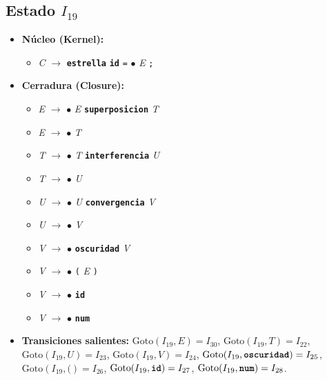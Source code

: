 \documentclass[12pt, letterpaper]{article}
\begin{document}
\subsection*{Estado $I_{19}$ }
\begin{itemize}\setlength{\itemsep}{1pt}\setlength{\parskip}{0pt}
\item \textbf{Núcleo (Kernel):}
\begin{itemize}\setlength{\itemsep}{1pt}\setlength{\parskip}{0pt}
    \item \textit{C} $\to$ \textbf{\texttt{estrella}} \textbf{\texttt{id}} \texttt{=} $\bullet$ \textit{E} \texttt{;}
\end{itemize}
\item \textbf{Cerradura (Closure):}
\begin{itemize}\setlength{\itemsep}{1pt}\setlength{\parskip}{0pt}
    \item \textit{E} $\to$ $\bullet$ \textit{E} \textbf{\texttt{superposicion}} \textit{T}
    \item \textit{E} $\to$ $\bullet$ \textit{T}
    \item \textit{T} $\to$ $\bullet$ \textit{T} \textbf{\texttt{interferencia}} \textit{U}
    \item \textit{T} $\to$ $\bullet$ \textit{U}
    \item \textit{U} $\to$ $\bullet$ \textit{U} \textbf{\texttt{convergencia}} \textit{V}
    \item \textit{U} $\to$ $\bullet$ \textit{V}
    \item \textit{V} $\to$ $\bullet$ \textbf{\texttt{oscuridad}} \textit{V}
    \item \textit{V} $\to$ $\bullet$ \texttt{(} \textit{E} \texttt{)}
    \item \textit{V} $\to$ $\bullet$ \textbf{\texttt{id}}
    \item \textit{V} $\to$ $\bullet$ \textbf{\texttt{num}}
\end{itemize}
\item \textbf{Transiciones salientes:} $\text{Goto}(I_{19}, \textit{E}) = I_{30}$, \quad $\text{Goto}(I_{19}, \textit{T}) = I_{22}$, \quad $\text{Goto}(I_{19}, \textit{U}) = I_{23}$, \quad $\text{Goto}(I_{19}, \textit{V}) = I_{24}$, \quad $\text{Goto}(I_{19}, \textbf{\texttt{oscuridad}}) = I_{25}$, \quad $\text{Goto}(I_{19}, \texttt{(}) = I_{26}$, \quad $\text{Goto}(I_{19}, \textbf{\texttt{id}}) = I_{27}$, \quad $\text{Goto}(I_{19}, \textbf{\texttt{num}}) = I_{28}$.
\end{itemize}
\vspace{2pt}
\end{document}
